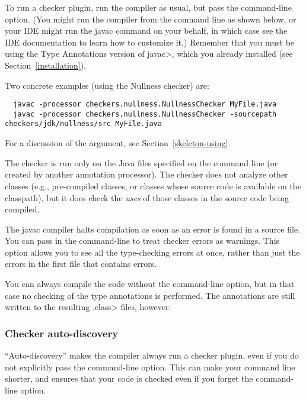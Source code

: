 To run a checker plugin, run the compiler  as usual,
but pass the  command-line
option.
(You might run the compiler from the command line as shown below, or your
IDE might run the javac command on your behalf, in which case see the IDE
documentation to learn how to customize it.)
Remember that you must be using the
Type Annotations version of \<javac>, which you already installed (see Section~\ref{installation}).

Two concrete examples (using the Nullness checker) are:

\begin{smaller}
\begin{Verbatim}
  javac -processor checkers.nullness.NullnessChecker MyFile.java
  javac -processor checkers.nullness.NullnessChecker -sourcepath checkers/jdk/nullness/src MyFile.java
\end{Verbatim}
\end{smaller}

\noindent
For a discussion of the  argument, see
Section~\ref{skeleton-using}.

The checker is run only on the Java files specified on the command line (or
created by another annotation processor).
The checker does not analyze other classes (e.g., pre-compiled classes, or
classes whose source
code is available on the classpath), but it does check
the \emph{uses} of those classes in the source code being compiled.

The javac compiler halts compilation as soon as an error is found in a
source file.  You can pass  in the command-line to
treat checker errors as warnings.  This option allows you to see all
the type-checking errors at once, rather than just the errors in the first
file that contains errors.

You can always compile the code without the 
command-line option, but in that case no checking of the type
annotations is performed.  The annotations are still written to the
resulting \<.class> files, however.


\subsubsection{Checker auto-discovery}

``Auto-discovery'' makes the  compiler always run a checker
plugin, even if you do not explicitly pass the 
command-line option.  This can make your command line shorter, and ensures
that your code is checked even if you forget the command-line option.

